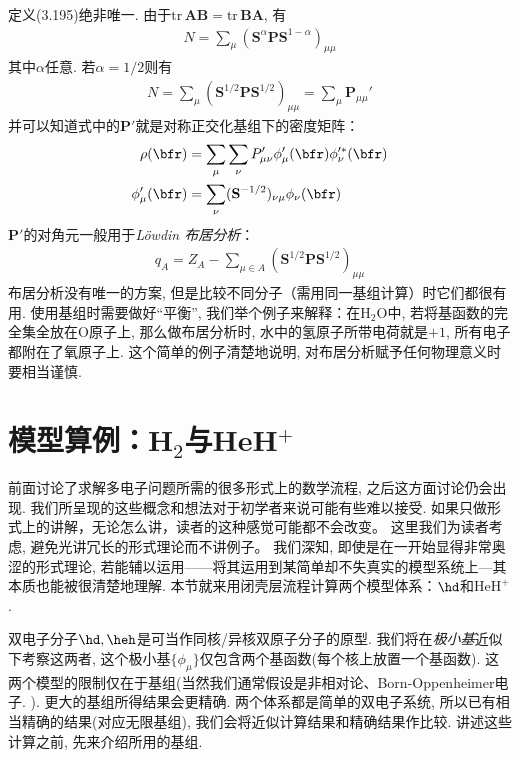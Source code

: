 定义(3.195)绝非唯一. 
由于$\mathrm{tr}\,\mathbf{AB}=\mathrm{tr}\,\mathbf{BA}$, 
有
\begin{align}
	N = \sum_\mu (\mathbf{S}^\alpha\mathbf{PS}^{1-\alpha})_{\mu\mu}
\end{align}
其中$\alpha$任意. 
若$\alpha=1/2$则有
\begin{align}
	\label{3.198}
	N = \sum_\mu (\mathbf{S}^{1/2}\mathbf{PS}^{1/2})_{\mu\mu} = \sum_\mu \mathbf{P}_{\mu\mu}'
\end{align}
并可以知道式中的$\mathbf{P}'$就是对称正交化基组下的密度矩阵：
\begin{align}
	\rho(\bfr) &= \sum_\mu\sum_\nu P'_{\mu\nu}\phi_\mu'(\bfr)\phi_\nu^{\prime *}(\bfr)\\
	\phi'_{\mu}(\bfr) &= \sum_\nu(\mathbf{S}^{-1/2})_{\nu\mu}\phi_\nu(\bfr)
\end{align}
$\mathbf{P}'$的对角元一般用于\emph{L\"owdin 布居分析}：
\begin{align}
	q_A = Z_A - \sum_{\mu\in A}(\mathbf{S}^{1/2}\mathbf{PS}^{1/2})_{\mu\mu}
\end{align}
布居分析没有唯一的方案, 
但是比较不同分子（需用同一基组计算）时它们都很有用. 
使用基组时需要做好``平衡'', 
我们举个例子来解释：在$\mathrm{H}_2\mathrm{O}$中, 
若将基函数的完全集全放在$\mathrm{O}$原子上, 
那么做布居分析时, 
水中的氢原子所带电荷就是$+1$, 
所有电子都附在了氧原子上. 
这个简单的例子清楚地说明,
对布居分析赋予任何物理意义时要相当谨慎.

\section{模型算例：H$_2$与HeH$^+$}
\label{sec:3.5}
前面讨论了求解多电子问题所需的很多形式上的数学流程, 
之后这方面讨论仍会出现. 
我们所呈现的这些概念和想法对于初学者来说可能有些难以接受. 如果只做形式上的讲解，无论怎么讲，读者的这种感觉可能都不会改变。
这里我们为读者考虑, 避免光讲冗长的形式理论而不讲例子。 
我们深知, 即使是在一开始显得非常奥涩的形式理论, 
若能辅以运用——将其运用到某简单却不失真实的模型系统上---其本质也能被很清楚地理解. 
本节就来用闭壳层\hft 流程计算两个模型体系：$\hd$和$\mathrm{HeH}^+$.


双电子分子$\hd,\heh$是可当作同核/异核双原子分子的原型. 
我们将在\emph{极小基}近似下考察这两者, 
这个极小基$\{\phi_\mu\}$仅包含两个基函数(每个核上放置一个基函数). 
这两个模型的限制仅在于基组(当然我们通常假设是非相对论、Born-Oppenheimer电子\ha.
). 
更大的基组所得结果会更精确. 
两个体系都是简单的双电子系统, 
所以已有相当精确的结果(对应无限基组), 
我们会将近似计算结果和精确结果作比较. 
讲述这些计算之前, 
先来介绍所用的基组.

